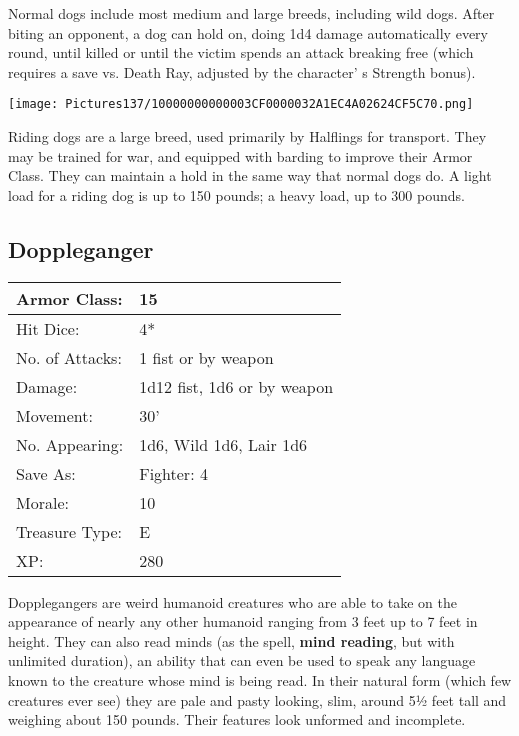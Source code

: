 \documentclass[a4paper,twoside,openany,10pt]{book}
\begin{document}
\begin{multicols}{2}
Normal dogs include most medium and large breeds, including wild dogs. After biting an opponent, a dog can hold on, doing 1d4 damage automatically every round, until killed or until the victim spends an attack breaking free (which requires a save vs. Death Ray, adjusted by the character' s Strength bonus).


\begin{center}
	\texttt{[image: Pictures137/10000000000003CF0000032A1EC4A02624CF5C70.png]}
\end{center}

Riding dogs are a large breed, used primarily by Halflings for transport. They may be trained for war, and equipped with barding to improve their Armor Class. They can maintain a hold in the same way that normal dogs do. A light load for a riding dog is up to 150 pounds; a heavy load, up to 300 pounds.

\subsection*{Doppleganger}\label{doppleganger}


\begin{tabularx}{0.48\textwidth}{@{}lX@{}}
Armor Class: & 15 \\\hline
Hit Dice: & 4* \\\hline
No. of Attacks: & 1 fist or by weapon \\\hline
Damage: & 1d12 fist, 1d6 or by weapon \\\hline
Movement: & 30' \\\hline
No. Appearing: & 1d6, Wild 1d6, Lair 1d6 \\\hline
Save As: & Fighter: 4 \\\hline
Morale: & 10 \\\hline
Treasure Type: & E \\\hline
XP: & 280 \\\hline
\end{tabularx}\medskip

Dopplegangers are weird humanoid creatures who are able to take on the appearance of nearly any other humanoid ranging from 3 feet up to 7 feet in height. They can also read minds (as the spell, \textbf{mind reading}, but with unlimited duration), an ability that can even be used to speak any language known to the creature whose mind is being read. In their natural form (which few creatures ever see) they are pale and pasty looking, slim, around 5½ feet tall and weighing about 150 pounds. Their features look unformed and incomplete.


\end{multicols}
\end{document}
